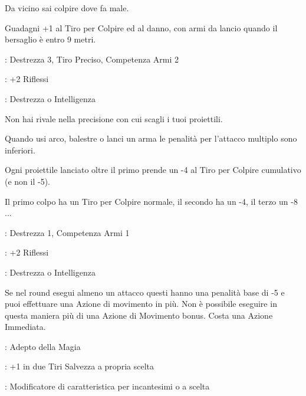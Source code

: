 \begin{multicols}{2}
Da vicino sai colpire dove fa male.

Guadagni +1 al Tiro per Colpire ed al danno, con armi da lancio quando il bersaglio è entro 9 metri.


\begin{description}[noitemsep, topsep=0pt, parsep=0pt, partopsep=0pt, leftmargin=0cm, labelwidth=2.5cm]
    \item[\textbf{Requisito}]: Destrezza 3, Tiro Preciso, Competenza Armi 2
    \item[\textbf{Tiri Salvezza}]: +2 Riflessi
    \item[\textbf{Caratteristica}]: Destrezza o Intelligenza
\end{description}

Non hai rivale nella precisione con cui scagli i tuoi proiettili.

Quando usi arco, balestre o lanci un arma le penalità per l'attacco multiplo sono inferiori.

Ogni proiettile lanciato oltre il primo prende un -4 al Tiro per Colpire cumulativo (e non il -5).

Il primo colpo ha un Tiro per Colpire normale, il secondo ha un -4, il terzo un -8 ...

\begin{description}[noitemsep, topsep=0pt, parsep=0pt, partopsep=0pt, leftmargin=0cm, labelwidth=2.5cm]
    \item[\textbf{Requisito}]: Destrezza 1, Competenza Armi 1
    \item[\textbf{Tiri Salvezza}]: +2 Riflessi
    \item[\textbf{Caratteristica}]: Destrezza o Intelligenza
\end{description}

Se nel round esegui almeno un attacco questi hanno una penalità base di -5 e puoi effettuare una Azione di movimento in più. Non è possibile eseguire in questa maniera più di una Azione di Movimento bonus. Costa una Azione Immediata.

\begin{description}[noitemsep, topsep=0pt, parsep=0pt, partopsep=0pt, leftmargin=0cm, labelwidth=2.5cm]
    \item[\textbf{Requisito}]: Adepto della Magia
    \item[\textbf{Tiri Salvezza}]: +1 in due Tiri Salvezza a propria scelta
    \item[\textbf{Caratteristica}]: Modificatore di caratteristica per incantesimi o a scelta
\end{description}


\end{multicols}
